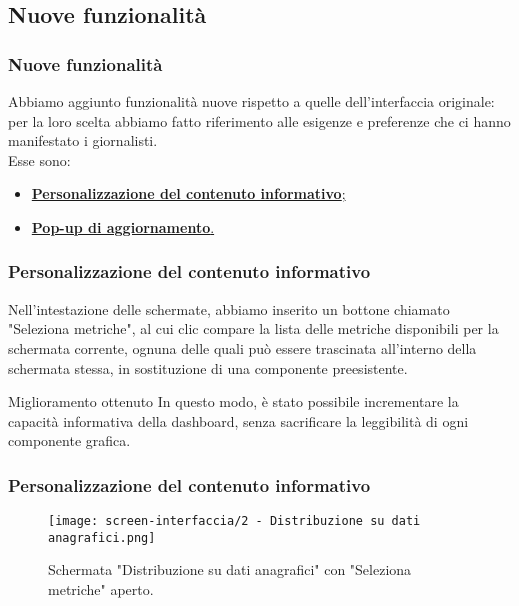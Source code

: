 \subsection{Nuove funzionalità}

\begin{frame}
    \frametitle{Nuove funzionalità}
    Abbiamo aggiunto funzionalità nuove rispetto a quelle dell'interfaccia originale: per la loro scelta abbiamo fatto riferimento alle esigenze e preferenze che ci hanno manifestato i giornalisti.\\
    Esse sono:
    \begin{itemize}
        \item \hyperlink{f:custom}{\textbf{Personalizzazione del contenuto informativo};}
        \item \hyperlink{f:pop}{\textbf{Pop-up di aggiornamento}.}        
    \end{itemize}

\end{frame}

\begin{frame}
    \frametitle{Personalizzazione del contenuto informativo}
    \label{f:custom}
    Nell'intestazione delle schermate, abbiamo inserito un bottone chiamato "Seleziona metriche", al cui clic compare la lista delle metriche disponibili per la schermata corrente, ognuna delle quali può essere trascinata all'interno della schermata stessa, in sostituzione di una componente preesistente. 
    \vspace{-30pt}
    \begin{alertblock}{Miglioramento ottenuto}
        In questo modo, è stato possibile incrementare la capacità informativa della dashboard, senza sacrificare la leggibilità di ogni componente grafica.        
    \end{alertblock}

\end{frame}

\begin{frame}
    \frametitle{Personalizzazione del contenuto informativo}
    \begin{figure}
        \centering
        \texttt{[image: screen-interfaccia/2 - Distribuzione su dati anagrafici.png]}
        \caption{Schermata "Distribuzione su dati anagrafici" con "Seleziona metriche" aperto.}
    \end{figure}

\end{frame}

